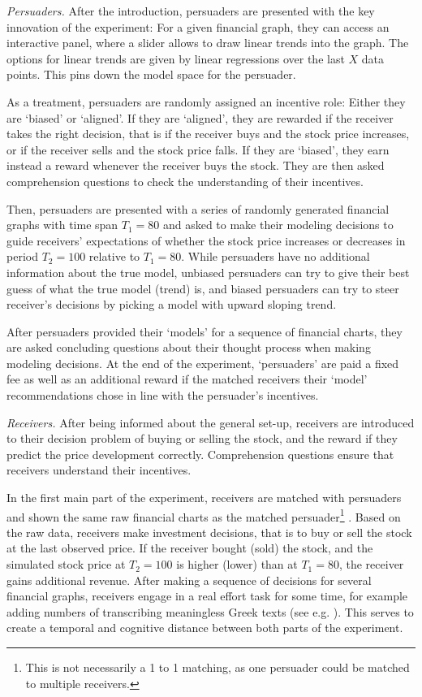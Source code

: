 \documentclass[11pt, a4paper, leqno]{article}
\begin{document}
\textit{Persuaders.} After the introduction, persuaders are presented with the key innovation of the experiment: For a given financial graph, they can access an interactive panel, where a slider allows to draw linear trends into the graph. The options for linear trends are given by linear regressions over the last $X$ data points. This pins down the model space for the persuader. 

As a treatment, persuaders are randomly assigned an incentive role: Either they are `biased' or `aligned'. If they are `aligned', they are rewarded if the receiver takes the right decision, that is if the receiver buys and the stock price increases, or if the receiver sells and the stock price falls. If they are `biased', they earn instead a reward whenever the receiver buys the stock. They are then asked comprehension questions to check the understanding of their incentives.

Then, persuaders are presented with a series of randomly generated financial graphs with time span $T_1 = 80$ and asked to make their modeling decisions to guide receivers' expectations of whether the stock price increases or decreases in period $T_2=100$ relative to $T_1 = 80$. While persuaders have no additional information about the true model, unbiased persuaders can try to give their best guess of what the true model (trend) is, and biased persuaders can try to steer receiver's decisions by picking a model with upward sloping trend.

After persuaders provided their `models' for a sequence of financial charts, they are asked concluding questions about their thought process when making modeling decisions. At the end of the experiment, `persuaders' are paid a fixed fee as well as an additional reward if the matched receivers their `model' recommendations chose in line with the persuader's incentives. 

\textit{Receivers.} After being informed about the general set-up, receivers are introduced to their decision problem of buying or selling the stock, and the reward if they predict the price development correctly. Comprehension questions ensure that receivers understand their incentives.

In the first main part of the experiment, receivers are matched with persuaders and shown the same raw financial charts as the matched persuader\footnote{ This is not necessarily a 1 to 1 matching, as one persuader could be matched to multiple receivers.} . Based on the raw data, receivers make investment decisions, that is to buy or sell the stock at the last observed price. If the receiver bought (sold) the stock, and the simulated stock price at $T_2=100$ is higher (lower) than at $T_1=80$, the receiver gains additional revenue. After making a sequence of decisions for several financial graphs, receivers engage in a real effort task for some time, for example adding numbers of transcribing meaningless Greek texts (see e.g. \cite{Augenblick}). This serves to create a temporal and cognitive distance between both parts of the experiment.
\end{document}

